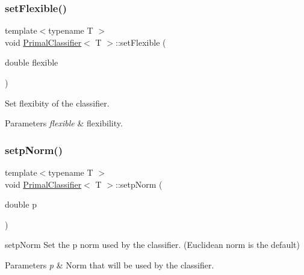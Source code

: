 \subsubsection{\texorpdfstring{set\+Flexible()}{setFlexible()}}
{\footnotesize\ttfamily template$<$typename T $>$ \\
void \hyperlink{class_primal_classifier}{Primal\+Classifier}$<$ T $>$\+::set\+Flexible (\begin{DoxyParamCaption}\item[{double}]{flexible }\end{DoxyParamCaption})\hspace{0.3cm}{\ttfamily [inline]}}



Set flexibity of the classifier. 


\begin{DoxyParams}{Parameters}
{\em flexible} & flexibility. \\
\hline
\end{DoxyParams}
\mbox{\label{class_primal_classifier_ad0c3b7577b6c11da7394105dd2002f1d}} 
\subsubsection{\texorpdfstring{setp\+Norm()}{setpNorm()}}
{\footnotesize\ttfamily template$<$typename T $>$ \\
void \hyperlink{class_primal_classifier}{Primal\+Classifier}$<$ T $>$\+::setp\+Norm (\begin{DoxyParamCaption}\item[{double}]{p }\end{DoxyParamCaption})\hspace{0.3cm}{\ttfamily [inline]}}



setp\+Norm Set the p norm used by the classifier. (Euclidean norm is the default) 


\begin{DoxyParams}{Parameters}
{\em p} & Norm that will be used by the classifier. \\
\hline
\end{DoxyParams}
\mbox{\label{class_primal_classifier_a7e6953c01b190e6ef968b75bd578ad7d}} 
